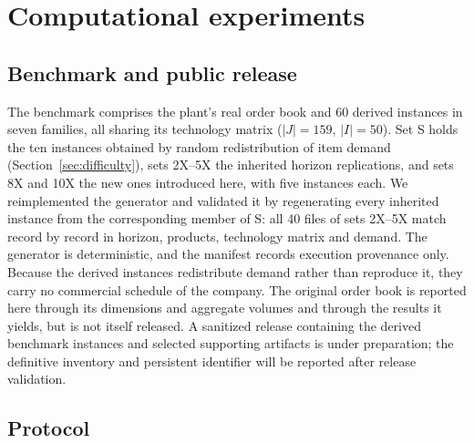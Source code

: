 \section{Computational experiments}
\label{sec:experiments}

\subsection{Benchmark and public release}
\label{sec:benchmark}

The benchmark comprises the plant's real order book and 60 derived
instances in seven families, all sharing its technology matrix
($|J|=159$, $|I|=50$). Set S holds the ten instances obtained by
random redistribution of item demand
(Section~\ref{sec:difficulty}), sets 2X--5X the inherited horizon
replications, and sets 8X and 10X the new ones introduced here, with
five instances each. We reimplemented the generator and validated it
by regenerating every inherited instance from the corresponding member
of S: all 40 files of sets 2X--5X match record by record in horizon,
products, technology matrix and demand. The generator is
deterministic, and the manifest records execution provenance only.
Because the derived instances redistribute demand rather than
reproduce it, they carry no commercial schedule of the company. The
original order book is reported here through its dimensions and
aggregate volumes and through the results it yields, but is not itself
released. A sanitized release containing the derived benchmark
instances and selected supporting artifacts is under preparation; the
definitive inventory and persistent identifier will be reported after
release validation.

\subsection{Protocol}
\label{sec:protocol}

